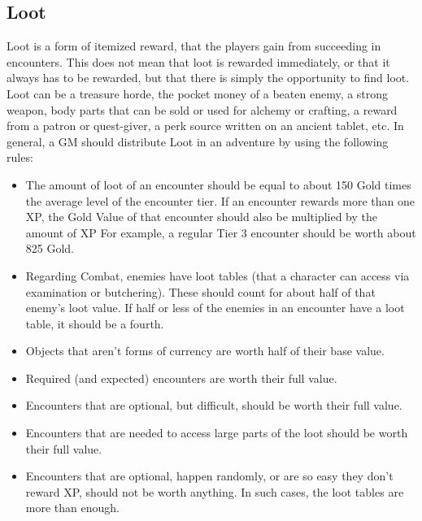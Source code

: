 \subsection{Loot}\label{subsec:loot}
Loot is a form of itemized reward, that the players gain from succeeding in encounters.
This does not mean that loot is rewarded immediately, or that it always has to be rewarded, but that there is simply the opportunity to find loot.
Loot can be a treasure horde, the pocket money of a beaten enemy, a strong weapon, body parts that can be sold or used for alchemy or crafting, a reward from a patron or quest-giver, a perk source written on an ancient tablet, etc.
In general, a GM should distribute Loot in an adventure by using the following rules:
\begin{itemize}
	\item The amount of loot of an encounter should be equal to about 150 Gold times the average level of the encounter tier.
	If an encounter rewards more than one XP, the Gold Value of that encounter should also be multiplied by the amount of XP
	For example, a regular Tier 3 encounter should be worth about 825 Gold.
	\item Regarding Combat, enemies have loot tables (that a character can access via examination or butchering).
	These should count for about half of that enemy's loot value.
	If half or less of the enemies in an encounter have a loot table, it should be a fourth.
	\item Objects that aren't forms of currency are worth half of their base value.
	\item Required (and expected) encounters are worth their full value.
	\item Encounters that are optional, but difficult, should be worth their full value.
	\item Encounters that are needed to access large parts of the loot should be worth their full value.
	\item Encounters that are optional, happen randomly, or are so easy they don't reward XP, should not be worth anything.
	In such cases, the loot tables are more than enough.
\end{itemize}






